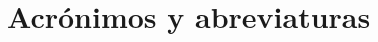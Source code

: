 \chapter{Acrónimos y abreviaturas}
\label{ap:acronimos}



\label{acro:MITRE}\label{acro:NVIDIA}
\label{acro:SLIKUBE}
\label{acro:CTF}\label{acro:DEVOPS}
\label{acro:ESC}\label{acro:K8S}
\label{acro:LAT}
\label{acro:BFS}\label{acro:CPU}
\label{acro:CUDA}\label{acro:CVE}
\label{acro:GPU}\label{acro:IA}
\label{acro:MPS}\label{acro:RBF}
\label{acro:SRE}\label{acro:UNSW}

